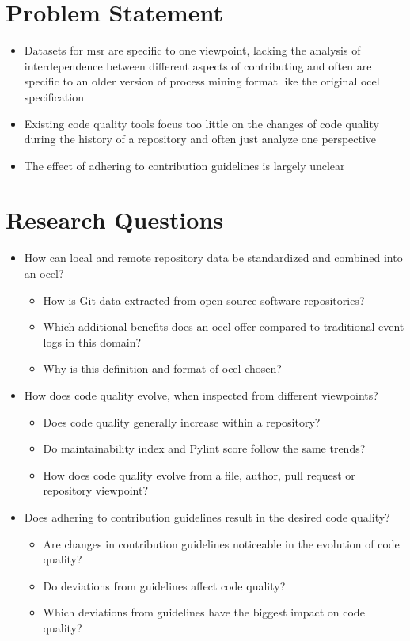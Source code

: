 \section{Problem Statement}
\label{sec:intro_ssec:probs}
\begin{itemize}
	\item Datasets for \ac{msr} are specific to one viewpoint, lacking the analysis of interdependence between different aspects of contributing and often are specific to an older version of process mining format like the original \ac{ocel} specification
	\item Existing code quality tools focus too little on the changes of code quality during the history of a repository and often just analyze one perspective
	\item The effect of adhering to contribution guidelines is largely unclear
\end{itemize}


\section{Research Questions}
\label{sec:intro_ssec:rqs}
\begin{itemize}
	\item How can local and remote repository data be standardized and combined into an \ac{ocel}?
	\begin{itemize}
		\item How is Git data extracted from open source software repositories?
		\item Which additional benefits does an \ac{ocel} offer compared to traditional event logs in this domain?
		\item Why is this definition and format of \ac{ocel} chosen?
	\end{itemize}
	\item How does code quality evolve, when inspected from different viewpoints?
	\begin{itemize}
		\item Does code quality generally increase within a repository?
		\item Do maintainability index and Pylint score follow the same trends?
		\item How does code quality evolve from a file, author, pull request or repository viewpoint?
	\end{itemize}
	\item Does adhering to contribution guidelines result in the desired code quality?
	\begin{itemize}
		\item Are changes in contribution guidelines noticeable in the evolution of code quality?
		\item Do deviations from guidelines affect code quality?
		\item Which deviations from guidelines have the biggest impact on code quality?
	\end{itemize}
\end{itemize}

